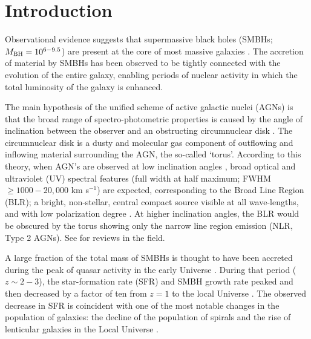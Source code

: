 \documentclass[modern]{CORE-AAS/aastex631}
\begin{document}
\section{Introduction} \label{sec:intro}
Observational evidence suggests that supermassive black holes (SMBHs; $M_{\rm BH}=10^{6-9.5}$) are present at the core of most massive galaxies \citep{kormendy+2013araa51_511}. The accretion of material by SMBHs has been observed to be tightly connected with the evolution of the entire galaxy, enabling periods of nuclear activity in which the total luminosity of the galaxy is enhanced. 

The main hypothesis of the unified scheme of active galactic nuclei (AGNs) is that the broad range of spectro-photometric properties is caused by the angle of inclination between the observer and an obstructing circumnuclear disk \citep{antonucci1993araa31_473, urry+1995pasp107_803}. The circumnuclear disk is a dusty and molecular gas component of outflowing and inflowing material surrounding the AGN, the so-called `torus'. According to this theory, when AGN's are observed at low inclination angles \citep[$i<45$--$60^{\circ}$, where $i=0^{\circ}$ would be face-on,][]{marin2014mnras441_551}, broad optical and ultraviolet (UV) spectral features (full width at half maximum; FWHM $\geq 1000-20,000$ km s$^{-1}$) are expected, corresponding to the Broad Line Region (BLR); a bright, non-stellar, central compact source visible at all wave-lengths, and with low polarization degree \citep[Type 1 AGNs,][]{netzer2015araa53_365}. At higher inclination angles, the BLR would be obscured by the torus showing only the narrow line region emission (NLR, Type 2 AGNs). See \citet{peterson2006incollection_77, netzer2015araa53_365, ramosalmeida+2017nat1_679} for reviews in the field.


A large fraction of the total mass of SMBHs is thought to have been accreted during the peak of quasar activity in the early Universe \citep[$z=2-3$,][]{boyle+1998mnras293_49, delvecchio+2014mnras439_2736, madau+2014araa52_415}. During that period ($z\sim2-3$), the star-formation rate (SFR) and SMBH growth rate peaked and then decreased by a factor of ten from $z=1$ to the local Universe \citep{shankar+2009apj690_20}. The observed decrease in SFR is coincident with one of the most notable changes in the population of galaxies: the decline of the population of spirals and the rise of lenticular galaxies in the Local Universe \citep{dressler+1997apj490_577}.
\end{document}
